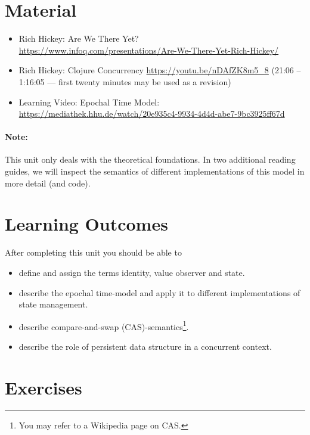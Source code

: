 \documentclass[11pt,a4paper]{article}
\begin{document}
	

\section{Material} 

\begin{itemize}
\item Rich Hickey: Are We There Yet? \\ \url{https://www.infoq.com/presentations/Are-We-There-Yet-Rich-Hickey/}
\item Rich Hickey: Clojure Concurrency \url{https://youtu.be/nDAfZK8m5_8} (21:06 -- 1:16:05 --- first twenty minutes may be used as a revision)
\item Learning Video: Epochal Time Model: \url{https://mediathek.hhu.de/watch/20e935c4-9934-4d4d-abe7-9bc3925ff67d}
\end{itemize}

\paragraph{Note:} This unit only deals with the theoretical foundations.
In two additional reading guides, we will inspect the semantics of different implementations of this model
in more detail (and code).

\section{Learning Outcomes}

After completing this unit you should be able to

\begin{itemize}
	\item define and assign the terms identity, value observer and state.
    \item describe the epochal time-model and apply it to different implementations of state management.
    \item describe compare-and-swap (CAS)-semantics\footnote{You may refer to a Wikipedia page on CAS.}.
    \item describe the role of persistent data structure in a concurrent context.
\end{itemize}


\section{Exercises}
\end{document}
